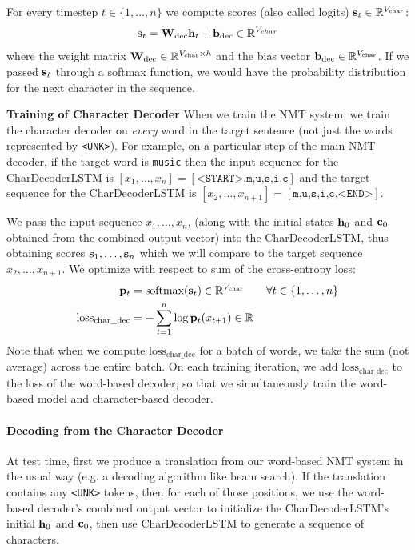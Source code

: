 For every timestep $t \in \{1,\dots,n\}$ we compute scores (also called logits) $\mathbf{s}_t \in \mathbb{R}^{V_\text{char}}$:
\begin{equation} \label{eq:decoder_logits}
    \mathbf{s}_t = \mathbf{W}_\text{dec} \mathbf{h}_t + \mathbf{b}_\text{dec} \in \mathbb{R}^{V_{char}}
\end{equation}
where the weight matrix $\mathbf{W}_\text{dec} \in \mathbb{R}^{V_\text{char} \times h}$ and the bias vector $\mathbf{b}_\text{dec} \in \mathbb{R}^{V_\text{char}}$.
If we passed $\mathbf{s}_t$ through a softmax function, we would have the probability distribution for the next character in the sequence.

\textbf{Training of Character Decoder}
When we train the NMT system, we train the character decoder on \textit{every} word in the target sentence (not just the words represented by \texttt{<UNK>}).
For example, on a particular step of the main NMT decoder, if the target word is \texttt{music} then the input sequence for the CharDecoderLSTM is $[x_1,\dots,x_n] = [\texttt{<START>,m,u,s,i,c}]$ and the target sequence for the CharDecoderLSTM is $[x_2,\dots,x_{n+1}] = [\texttt{m,u,s,i,c,<END>}]$.

We pass the input sequence $x_1,\dots,x_n$, (along with the initial states $\mathbf{h}_0$ and $\mathbf{c}_0$ obtained from the combined output vector) into the CharDecoderLSTM, thus obtaining scores $\mathbf{s}_1,\dots,\mathbf{s}_n$ which we will compare to the target sequence $x_2,\dots,x_{n+1}$.
We optimize with respect to sum of the cross-entropy loss:
\begin{align}
    \mathbf{p}_t &= \text{softmax}(\mathbf{s}_t) \in \mathbb{R}^{V_\text{char}} \qquad \forall t\in \{1,\dots,n\} \\
    \text{loss}_\text{char\_dec} &= - \sum_{t=1}^n \log \mathbf{p}_t (x_{t+1}) \in \mathbb{R}
\end{align}
Note that when we compute $\text{loss}_\text{char\_dec}$ for a batch of words, we take the sum (not average) across the entire batch.
On each training iteration, we add $\text{loss}_\text{char\_dec}$ to the loss of the word-based decoder, so that we simultaneously train the word-based model and character-based decoder.

\paragraph{Decoding from the Character Decoder}
At test time, first we produce a translation from our word-based NMT system in the usual way (e.g. a decoding algorithm like beam search).
If the translation contains any \texttt{<UNK>} tokens, then for each of those positions, we use the word-based decoder's combined output vector to initialize the CharDecoderLSTM's initial $\mathbf{h}_0$ and $\mathbf{c}_0$, then use CharDecoderLSTM to generate a sequence of characters.

